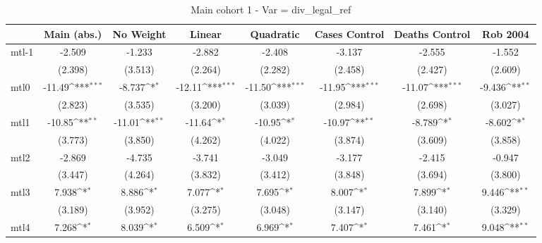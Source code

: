 \documentclass{article}
\begin{document}
{
\def\sym#1{\ifmmode^{#1}\else\(^{#1}\)\fi}
\begin{longtable}{l*{7}{c}}
\caption{Main cohort 1 - Var = div\_legal\_ref}\\
\hline\hline\endfirsthead\hline\endhead\hline\endfoot\endlastfoot
                &\multicolumn{1}{c}{Main (abs.)}&\multicolumn{1}{c}{No Weight}&\multicolumn{1}{c}{Linear}&\multicolumn{1}{c}{Quadratic}&\multicolumn{1}{c}{Cases Control}&\multicolumn{1}{c}{Deaths Control}&\multicolumn{1}{c}{Rob 2004}\\
\hline
mtl-1           &   -2.509         &   -1.233         &   -2.882         &   -2.408         &   -3.137         &   -2.555         &   -1.552         \\
                &  (2.398)         &  (3.513)         &  (2.264)         &  (2.282)         &  (2.458)         &  (2.427)         &  (2.609)         \\
mtl0            &   -11.49\sym{***}&   -8.737\sym{*}  &   -12.11\sym{***}&   -11.50\sym{***}&   -11.95\sym{***}&   -11.07\sym{***}&   -9.436\sym{**} \\
                &  (2.823)         &  (3.535)         &  (3.200)         &  (3.039)         &  (2.984)         &  (2.698)         &  (3.027)         \\
mtl1            &   -10.85\sym{**} &   -11.01\sym{**} &   -11.64\sym{*}  &   -10.95\sym{*}  &   -10.97\sym{**} &   -8.789\sym{*}  &   -8.602\sym{*}  \\
                &  (3.773)         &  (3.850)         &  (4.262)         &  (4.022)         &  (3.874)         &  (3.609)         &  (3.858)         \\
mtl2            &   -2.869         &   -4.735         &   -3.741         &   -3.049         &   -3.177         &   -2.415         &   -0.947         \\
                &  (3.447)         &  (4.264)         &  (3.832)         &  (3.412)         &  (3.848)         &  (3.694)         &  (3.800)         \\
mtl3            &    7.938\sym{*}  &    8.886\sym{*}  &    7.077\sym{*}  &    7.695\sym{*}  &    8.007\sym{*}  &    7.899\sym{*}  &    9.446\sym{**} \\
                &  (3.189)         &  (3.952)         &  (3.275)         &  (3.048)         &  (3.147)         &  (3.140)         &  (3.329)         \\
mtl4            &    7.268\sym{*}  &    8.039\sym{*}  &    6.509\sym{*}  &    6.969\sym{*}  &    7.407\sym{*}  &    7.461\sym{*}  &    9.048\sym{**} \\

\end{longtable}}
\end{document}

